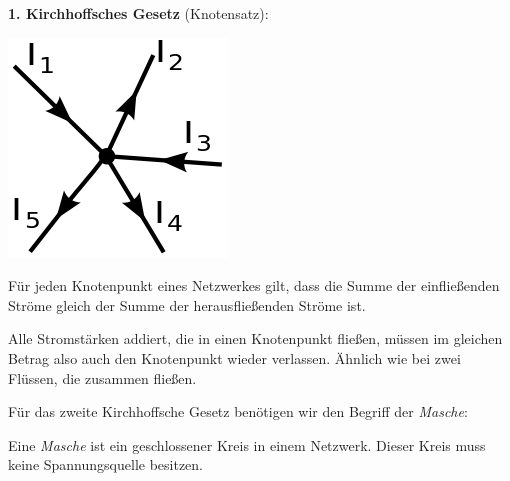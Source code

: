 \begin{sich}
\textbf{1. Kirchhoffsches Gesetz} (Knotensatz):


\begin{center}
\includegraphics[scale=.8]{pics/knotenregel}
\end{center}

Für jeden Knotenpunkt eines Netzwerkes gilt, dass die Summe der einfließenden Ströme gleich der Summe der herausfließenden Ströme ist.
\end{sich}

Alle Stromstärken addiert, die in einen Knotenpunkt fließen, müssen im gleichen Betrag also auch den Knotenpunkt wieder verlassen. Ähnlich wie bei zwei Flüssen, die zusammen fließen.

Für das zweite Kirchhoffsche Gesetz benötigen wir den Begriff der \emph{Masche}:

\begin{sich}
Eine \emph{Masche} ist ein geschlossener Kreis in einem Netzwerk.
Dieser Kreis muss keine Spannungsquelle besitzen.
\end{sich}

